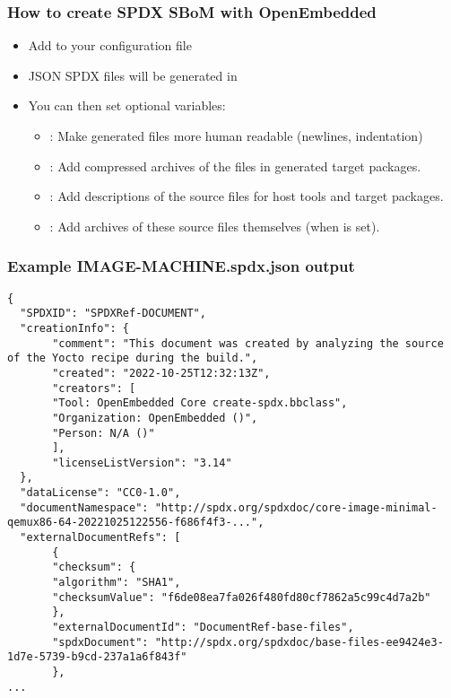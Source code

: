 \begin{frame}[fragile]
  \frametitle{How to create SPDX SBoM with OpenEmbedded}
  \begin{itemize}
     \item Add  to your configuration file
     \item JSON SPDX files will be generated in 
     \item You can then set optional variables:
           \begin{itemize}
              \item {}:
                    Make generated files more human readable (newlines, indentation)
              \item {}:
                    Add compressed archives of the files in generated target packages.
              \item {}:
                    Add descriptions of the source files for host tools and target packages.
              \item {}:
                    Add archives of these source files themselves (when  is set).
           \end{itemize}
  \end{itemize}
\end{frame}

\begin{frame}[fragile]
  \frametitle{Example IMAGE-MACHINE.spdx.json output}
  \begin{block}{}
    \fontsize{7}{7}\selectfont
    \begin{verbatim}
{
  "SPDXID": "SPDXRef-DOCUMENT",
  "creationInfo": {
       "comment": "This document was created by analyzing the source of the Yocto recipe during the build.",
       "created": "2022-10-25T12:32:13Z",
       "creators": [
       "Tool: OpenEmbedded Core create-spdx.bbclass",
       "Organization: OpenEmbedded ()",
       "Person: N/A ()"
       ],
       "licenseListVersion": "3.14"
  },
  "dataLicense": "CC0-1.0",
  "documentNamespace": "http://spdx.org/spdxdoc/core-image-minimal-qemux86-64-20221025122556-f686f4f3-...",
  "externalDocumentRefs": [
       {
       "checksum": {
       "algorithm": "SHA1",
       "checksumValue": "f6de08ea7fa026f480fd80cf7862a5c99c4d7a2b"
       },
       "externalDocumentId": "DocumentRef-base-files",
       "spdxDocument": "http://spdx.org/spdxdoc/base-files-ee9424e3-1d7e-5739-b9cd-237a1a6f843f"
       },
...
    \end{verbatim}
  \end{block}
\end{frame}


